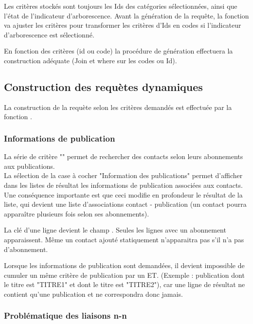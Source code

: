Les critères stockés sont toujours les Ids des catégories sélectionnées, ainsi que l'état de l'indicateur d'arborescence.
Avant la génération de la requête, la fonction  va ajuster les critères pour transformer les critères d'Ids en codes si l'indicateur d'arborescence est sélectionné.

En fonction des critères (id ou code) la procédure de génération effectuera la construction adéquate (Join et where sur les codes ou Id).


\subsection{Construction des requètes dynamiques}

La construction de la requète selon les critères demandés est effectuée par la fonction .


\subsubsection{Informations de publication}

La série de critère "\publication" permet de rechercher des contacts selon leurs abonnements aux publications.\\

La sélection de la case à cocher "Information des publications" permet d'afficher dans les listes de résultat les informations de publication associées aux contacts.
Une conséquence importante est que ceci modifie en profondeur le résultat de la liste, qui devient une liste d'associations contact - publication (un contact pourra apparaître plusieurs fois selon ses abonnements).

La clé d'une ligne devient le champ . Seules les lignes avec un abonnement apparaissent. Même un contact ajouté statiquement n'apparaitra pas s'il n'a pas d'abonnement.

Lorsque les informations de publication sont demandées, il devient impossible de cumuler un même critère de publication par un ET. (Exemple : publication dont le titre est "TITRE1" et dont le titre est "TITRE2"), car une ligne de résultat ne contient qu'une publication et ne correspondra donc jamais.


\subsubsection{Problématique des liaisons n-n}


